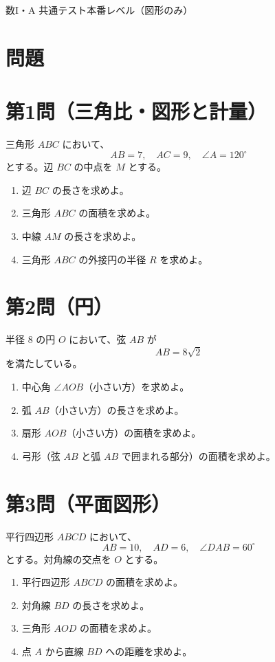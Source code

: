 \documentclass[a4paper,12pt]{jsarticle}
\begin{document}
\begin{center}
{\LARGE 数I・A 共通テスト本番レベル（図形のみ）}
\end{center}

\vspace{1em}

\section*{問題}

\section*{第1問（三角比・図形と計量）}
三角形 \(ABC\) において、
\[
AB=7,\quad AC=9,\quad \angle A=120^\circ
\]
とする。辺 \(BC\) の中点を \(M\) とする。
\begin{enumerate}[label=\arabic*.]
  \item 辺 \(BC\) の長さを求めよ。
  \item 三角形 \(ABC\) の面積を求めよ。
  \item 中線 \(AM\) の長さを求めよ。
  \item 三角形 \(ABC\) の外接円の半径 \(R\) を求めよ。
\end{enumerate}

\section*{第2問（円）}
半径 \(8\) の円 \(O\) において、弦 \(AB\) が
\[
AB=8\sqrt2
\]
を満たしている。
\begin{enumerate}[label=\arabic*.]
  \item 中心角 \(\angle AOB\)（小さい方）を求めよ。
  \item 弧 \(AB\)（小さい方）の長さを求めよ。
  \item 扇形 \(AOB\)（小さい方）の面積を求めよ。
  \item 弓形（弦 \(AB\) と弧 \(AB\) で囲まれる部分）の面積を求めよ。
\end{enumerate}

\section*{第3問（平面図形）}
平行四辺形 \(ABCD\) において、
\[
AB=10,\quad AD=6,\quad \angle DAB=60^\circ
\]
とする。対角線の交点を \(O\) とする。
\begin{enumerate}[label=\arabic*.]
  \item 平行四辺形 \(ABCD\) の面積を求めよ。
  \item 対角線 \(BD\) の長さを求めよ。
  \item 三角形 \(AOD\) の面積を求めよ。
  \item 点 \(A\) から直線 \(BD\) への距離を求めよ。
\end{enumerate}
\end{document}
